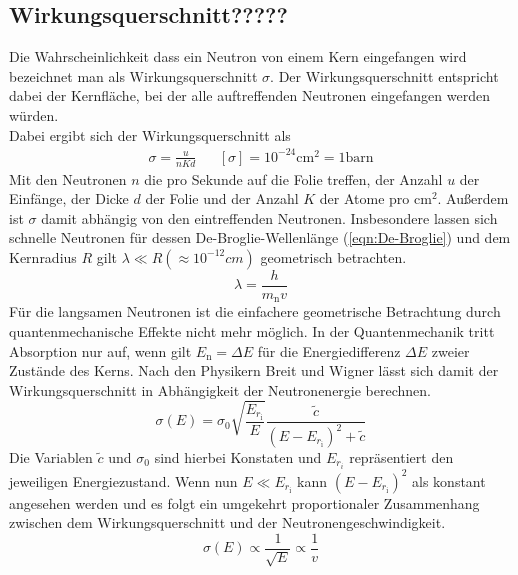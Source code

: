 \subsection{Wirkungsquerschnitt?????}
Die Wahrscheinlichkeit dass ein Neutron von einem Kern eingefangen wird bezeichnet man als Wirkungsquerschnitt $\sigma$.
Der Wirkungsquerschnitt entspricht dabei der Kernfläche, bei der alle auftreffenden Neutronen eingefangen werden würden.\\  
Dabei ergibt sich der Wirkungsquerschnitt als 
\begin{align}
    \sigma = \frac{u}{nKd} && [\sigma] = 10^{-24} \text{cm}^2 = 1 \text{barn}
\end{align}
Mit den Neutronen $n$ die pro Sekunde auf die Folie treffen, der Anzahl $u$ der Einfänge, der Dicke $d$ der Folie und der Anzahl $K$ der Atome pro $\text{cm}^2$.
Außerdem ist $\sigma$ damit abhängig von den eintreffenden Neutronen.
Insbesondere lassen sich schnelle Neutronen für dessen De-Broglie-Wellenlänge (\ref{eqn:De-Broglie}) und dem Kernradius $R$ gilt $\lambda \ll R (≈10^{-12}cm) $ geometrisch betrachten.
\begin{equation}
     \lambda = \frac{h}{m_{\text{n}} v} \label{eqn:De-Broglie}
\end{equation}
Für die langsamen Neutronen ist die einfachere geometrische Betrachtung durch quantenmechanische Effekte nicht mehr möglich.
In der Quantenmechanik tritt Absorption nur auf, wenn gilt $E_{\text{n}} = \Delta E$ für die Energiedifferenz $\Delta E$ zweier Zustände des Kerns.
Nach den Physikern Breit und Wigner lässt sich damit der Wirkungsquerschnitt in Abhängigkeit der Neutronenergie berechnen.
\begin{equation}
    \sigma(E) = \sigma_0 \sqrt{\frac{E_{r_{\text{i}}}}{E}} \frac{\tilde{c}}{\left(E-E_{r_{\text{i}}}\right)^2 + \tilde{c}}
\end{equation}
Die Variablen $\tilde{c}$ und $\sigma_0$ sind hierbei Konstaten und $E_{r_i}$ repräsentiert den jeweiligen Energiezustand.
Wenn nun $E \ll E_{r_{\text{i}}}$ kann $\left(E-E_{r_{\text{i}}}\right)^2$ als konstant angesehen werden und es folgt ein umgekehrt proportionaler Zusammenhang zwischen dem Wirkungsquerschnitt und der Neutronengeschwindigkeit.
\begin{equation}
    \sigma(E) \propto \frac{1}{\sqrt{E}} \propto \frac{1}{v}
\end{equation}

